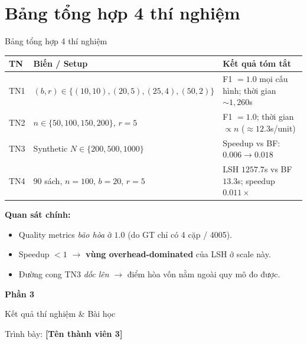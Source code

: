 \documentclass[10pt,aspectratio=169]{beamer}
\begin{document}
\section{Bảng tổng hợp 4 thí nghiệm}

\begin{frame}{Bảng tổng hợp 4 thí nghiệm}
  \scriptsize
  \begin{tabular}{@{}p{1.4cm}p{4.5cm}p{6cm}@{}}
    \toprule
    \textbf{TN} & \textbf{Biến / Setup} & \textbf{Kết quả tóm tắt} \\
    \midrule
    TN1 & $(b,r) \in \{(10,10),(20,5),(25,4),(50,2)\}$ & F1 $= 1.0$ mọi cấu hình; thời gian $\sim 1{,}260$s \\
    \midrule
    TN2 & $n \in \{50,100,150,200\}$, $r{=}5$ & F1 $= 1.0$; thời gian $\propto n$ ($\approx 12.3$s/unit) \\
    \midrule
    TN3 & Synthetic $N \in \{200,500,1000\}$ & Speedup vs BF: $0.006 \rightarrow 0.018$ \\
    \midrule
    TN4 & 90 sách, $n{=}100$, $b{=}20$, $r{=}5$ & LSH $1257.7$s vs BF $13.3$s; speedup $0.011\times$ \\
    \bottomrule
  \end{tabular}

  \vfill
  \footnotesize
  \textbf{Quan sát chính:}
  \begin{itemize}
    \item Quality metrics \emph{bão hòa} ở $1.0$ (do GT chỉ có 4 cặp / 4005).
    \item Speedup $< 1$ $\rightarrow$ \textbf{vùng overhead-dominated} của LSH ở scale này.
    \item Đường cong TN3 \emph{dốc lên} $\rightarrow$ điểm hòa vốn nằm ngoài quy mô đo được.
  \end{itemize}
\end{frame}

\begin{frame}[plain]
  \vfill
  \centering
  {\Huge\color{hcmutblue}\textbf{Phần 3}}\par
  \vspace{0.5em}
  {\Large Kết quả thí nghiệm \& Bài học}\par
  \vspace{1em}
  {\large Trình bày: \textbf{[Tên thành viên 3]}}\par
  \vfill
\end{frame}
\end{document}
